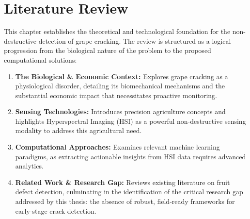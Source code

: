 %


\chapter{Literature Review}

This chapter establishes the theoretical and technological foundation for the non-destructive detection of grape cracking. The review is structured as a logical progression from the biological nature of the problem to the proposed computational solutions:

\begin{enumerate}
  \item \textbf{The Biological \& Economic Context:} Explores grape cracking as a physiological disorder, detailing its biomechanical mechanisms and the substantial economic impact that necessitates proactive monitoring.
  \item \textbf{Sensing Technologies:} Introduces precision agriculture concepts and highlights Hyperspectral Imaging (HSI) as a powerful non-destructive sensing modality to address this agricultural need.
  \item \textbf{Computational Approaches:} Examines relevant machine learning paradigms, as extracting actionable insights from HSI data requires advanced analytics.
  \item \textbf{Related Work \& Research Gap:} Reviews existing literature on fruit defect detection, culminating in the identification of the critical research gap addressed by this thesis: the absence of robust, field-ready frameworks for early-stage crack detection.
\end{enumerate}

\newpage
